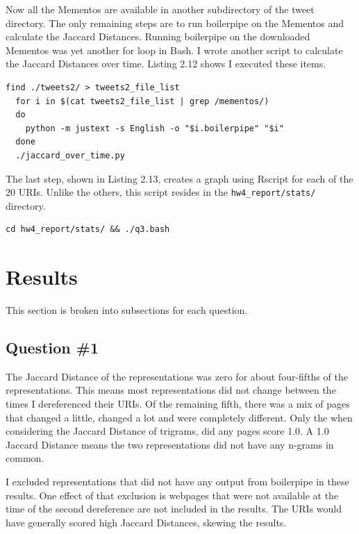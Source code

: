 \documentclass[a4paper,12pt]{article}
\begin{document}
Now all the Mementos are available in another subdirectory of the tweet directory. The only remaining steps
are to run boilerpipe on the Mementos and calculate the Jaccard Distances. Running boilerpipe on the
downloaded Mementos was yet another for loop in Bash. I wrote another script to calculate the Jaccard
Distances over time. Listing 2.12 shows I executed these items.

\begin{lstlisting}[basicstyle=\ttfamily,caption={Boilerpipe and Jaccard Distance}]
  find ./tweets2/ > tweets2_file_list
  for i in $(cat tweets2_file_list | grep /mementos/)
  do
    python -m justext -s English -o "$i.boilerpipe" "$i"
  done
  ./jaccard_over_time.py
\end{lstlisting}

The last step, shown in Listing 2.13, creates a graph using Rscript for each of the 20 URIs. Unlike the others,
this script resides in the \texttt{hw4\_report/stats/} directory.

\begin{lstlisting}[basicstyle=\ttfamily,caption={Generating R Graphs}]
    cd hw4_report/stats/ && ./q3.bash
\end{lstlisting}

\section{Results}
This section is broken into subsections for each question.

\subsection{Question \#1}
The Jaccard Distance of the representations was zero for about four-fifths of the representations. This means
most representations did not change between the times I dereferenced their URIs. Of the remaining fifth,
there was a mix of pages that changed a little, changed a lot and were completely different. Only the
when considering the Jaccard Distance of trigrams, did any pages score 1.0. A 1.0 Jaccard Distance means
the two representations did not have any n-grams in common.

I excluded representations that did not have any output from boilerpipe in these results. One effect of that
exclusion is webpages that were not available at the time of the second dereference are not included in the
results. The URIs would have generally scored high Jaccard Distances, skewing the results.
\end{document}
